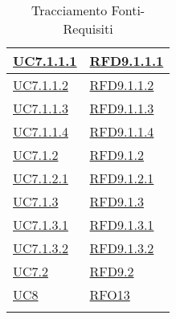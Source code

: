 \begin{longtable}{|>{\centering}m{5cm}|m{5cm}<{\centering}|}
\hyperref[UC7.1.1.1]{UC7.1.1.1} & \hyperlink{RFD9.1.1.1}{RFD9.1.1.1}\\ \hline
\hyperref[UC7.1.1.2]{UC7.1.1.2} & \hyperlink{RFD9.1.1.2}{RFD9.1.1.2}\\ \hline
\hyperref[UC7.1.1.3]{UC7.1.1.3} & \hyperlink{RFD9.1.1.3}{RFD9.1.1.3}\\ \hline
\hyperref[UC7.1.1.4]{UC7.1.1.4} & \hyperlink{RFD9.1.1.4}{RFD9.1.1.4}\\ \hline
\hyperref[UC7.1.2]{UC7.1.2} & \hyperlink{RFD9.1.2}{RFD9.1.2}\\ \hline
\hyperref[UC7.1.2.1]{UC7.1.2.1} & \hyperlink{RFD9.1.2.1}{RFD9.1.2.1}\\ \hline
\hyperref[UC7.1.3]{UC7.1.3} & \hyperlink{RFD9.1.3}{RFD9.1.3}\\ \hline
\hyperref[UC7.1.3.1]{UC7.1.3.1} & \hyperlink{RFD9.1.3.1}{RFD9.1.3.1}\\ \hline
\hyperref[UC7.1.3.2]{UC7.1.3.2} & \hyperlink{RFD9.1.3.2}{RFD9.1.3.2}\\ \hline
\hyperref[UC7.2]{UC7.2} & \hyperlink{RFD9.2}{RFD9.2}\\ \hline
\hyperref[UC8]{UC8} & \hyperlink{RFO13}{RFO13}\\ \hline
\caption[Tracciamento Fonti-Requisiti]{Tracciamento Fonti-Requisiti}
\label{tabella:fonti-requi}
\end{longtable}
\clearpage
